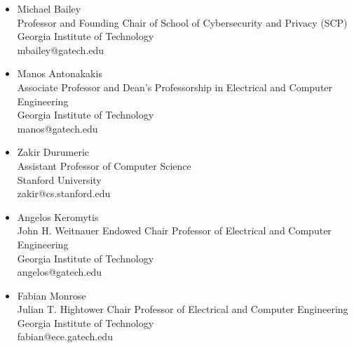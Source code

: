 \documentclass[10pt,singlecolumn]{article} %
\begin{document}
\begin{itemize}[label={}, leftmargin=*]
\setlength\itemsep{0.2em}
\item Michael Bailey\\
Professor and Founding Chair of School of Cybersecurity and Privacy (SCP)\\
Georgia Institute of Technology\\
mbailey@gatech.edu

\item Manos Antonakakis\\
Associate Professor and Dean's Professorship in Electrical and Computer Engineering\\
Georgia Institute of Technology\\
manos@gatech.edu


\item Zakir Durumeric \\
Assistant Professor of Computer Science \\
Stanford University \\
zakir@cs.stanford.edu 

\item Angelos Keromytis \\
John H. Weitnauer Endowed Chair Professor of Electrical and Computer Engineering \\
Georgia Institute of Technology \\
angelos@gatech.edu 

\item Fabian Monrose \\
Julian T. Hightower Chair Professor of Electrical and Computer Engineering \\
Georgia Institute of Technology \\
fabian@ece.gatech.edu 

\end{itemize}



%
%	
	
\end{document}
